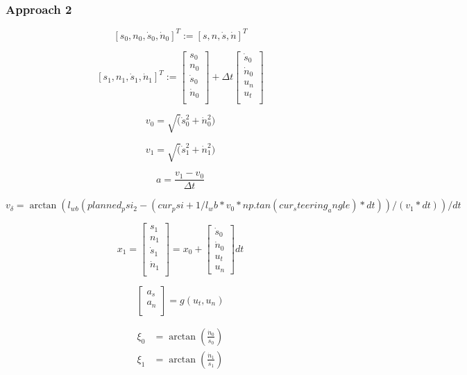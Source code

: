 \subsubsection{Approach 2}

\[
	[s_0, n_0, \dot{s}_0, \dot{n}_0]^T := [s, n, \dot{s}, \dot{n}]^T
\]

\[
	[s _1, n _1, \dot{s} _1, \dot{n} _1]^T := \begin{bmatrix}
		s_0       \\
		n_0       \\
		\dot{s}_0 \\
		\dot{n}_0 \\
	\end{bmatrix} + \Delta t \begin{bmatrix}
		\dot{s}_0 \\
		\dot{n}_0 \\
		u_n       \\
		u_t       \\
	\end{bmatrix}
\]

\[
	v_0 = \sqrt(\dot{s}_0^2 + \dot{n}_0^2)
\]

\[
	v_1 = \sqrt(\dot{s}_1^2 + \dot{n}_1^2)
\]

\[
	a = \frac{v_1 - v_0}{\Delta t}
\]

\[
	v_\delta = \arctan(l_{wb} (planned_psi_2 - (cur_psi + 1/l_wb * v_0 * np.tan(cur_steering_angle) * dt)) / (v_1 * dt)) / dt
\]

\pagebreak

\[
	x_1 = \begin{bmatrix}
		s_1 \\ n_1 \\ \dot{s}_1 \\ \dot{n}_1 \\
	\end{bmatrix} = x_0 + \begin{bmatrix}
		\dot{s}_0 \\ \dot{n}_0 \\ u_t \\ u_n
	\end{bmatrix} dt
\]

\[
	\begin{bmatrix}
		a_s \\
		a_n \\
	\end{bmatrix} = g(u_t, u_n)
\]

\[
	\begin{aligned}
		\xi_0 & = \arctan\left(\frac{\dot{n}_0}{\dot{s}_0}\right) \\
		\xi_1 & = \arctan\left(\frac{\dot{n}_1}{\dot{s}_1}\right)
	\end{aligned}
\]


